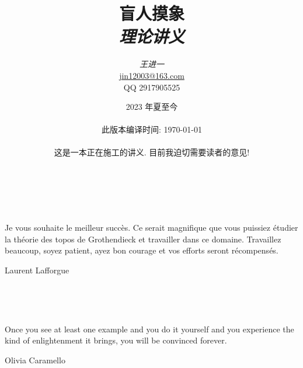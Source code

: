 \documentclass{book}
\title{\textbf{\huge 盲人摸象}\\\emph{\topos{}理论讲义}}
\author{\emph{王进一}\\\href{我的邮箱}{jin12003@163.com}\\QQ 2917905525}
\date{2023 年夏至今\\~\\~此版本编译时间: \today{}~\\~\\这是一本正在施工的讲义. 目前我迫切需要读者的意见!
\\~\\
}
\newcommand{\philoquote}[2]{
	~\\
	\begin{center}
		\begin{minipage}{0.7\linewidth}
			{\quad\sffamily #1}\\
			\begin{flushright}
				\textsf{#2}
			\end{flushright}
		\end{minipage}
	\end{center}
	~\\
}
\begin{document}
\dominitoc

\maketitle

\newpage

\vspace{4cm}

\philoquote{
	Je vous souhaite le meilleur succès. Ce serait magnifique que vous puissiez étudier la théorie des topos de Grothendieck et travailler dans ce domaine. Travaillez beaucoup, soyez patient, ayez bon courage et vos efforts seront récompensés.
}{
	Laurent Lafforgue\footnotemark
}

\philoquote{Once you see at least one example and you do it yourself and you experience the kind of enlightenment it brings, you will be convinced forever.}{Olivia Caramello\footnotemark}


\tableofcontents

\setcounter{chapter}{-1} %













%

%

%



\appendix





%



\printbibliography[title=参考文献]
\end{document}
